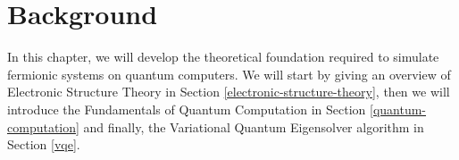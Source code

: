 \chapter{Background}%
\label{background}

In this chapter, we will develop the theoretical foundation required to simulate fermionic systems on quantum computers. We will start by giving an overview of Electronic Structure Theory in Section \ref{electronic-structure-theory}, then we will introduce the Fundamentals of Quantum Computation in Section \ref{quantum-computation} and finally, the Variational Quantum Eigensolver algorithm in Section \ref{vqe}.

